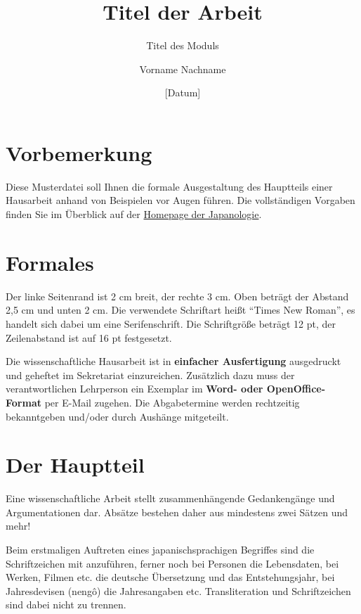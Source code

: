 \documentclass{japo}
\title{Titel der Arbeit}
\subtitle{Titel des Moduls}
\date{[Datum]}
\author{Vorname Nachname}
\begin{document}
\maketitle

\section{Vorbemerkung}
Diese Musterdatei soll Ihnen die formale Ausgestaltung des Hauptteils einer Hausarbeit anhand von Beispielen vor Augen führen. Die vollständigen Vorgaben finden Sie im Überblick auf der \href{\japfacultyhomepage}{Homepage der Japanologie}.

\section{Formales}
Der linke Seitenrand ist 2 cm breit, der rechte 3 cm. Oben beträgt der Abstand 2,5 cm und unten 2 cm. Die verwendete Schriftart heißt \enquote{Times New Roman}, es handelt sich dabei um eine Serifenschrift. Die Schriftgröße beträgt 12 pt, der Zeilenabstand ist auf 16 pt festgesetzt.%

Die wissenschaftliche Hausarbeit ist in \textbf{einfacher Ausfertigung} ausgedruckt und geheftet im Sekretariat einzureichen. Zusätzlich dazu muss der verantwortlichen Lehrperson ein Exemplar im \textbf{Word- oder OpenOffice-Format} per E-Mail zugehen. Die Abgabetermine werden rechtzeitig bekanntgeben und/oder durch Aushänge mitgeteilt.

\section{Der Hauptteil}
Eine wissenschaftliche Arbeit stellt zusammenhängende Gedankengänge und Argumentationen dar. Absätze bestehen daher aus mindestens zwei Sätzen und mehr!

Beim erstmaligen Auftreten eines japanischsprachigen Begriffes sind die Schriftzeichen mit anzuführen, ferner noch bei Personen die Lebensdaten, bei Werken, Filmen etc. die deutsche Übersetzung und das Entstehungsjahr, bei Jahresdevisen (nengô) die Jahresangaben etc. Transliteration und Schriftzeichen sind dabei nicht zu trennen.
\end{document}
